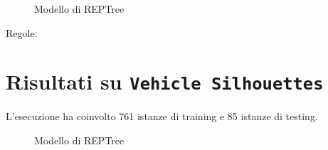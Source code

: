 \begin{mdframed}[frametitle=Esecuzione REPTree]
	\scriptsize
\end{mdframed}

%

\begin{figure}[htb]
	\caption{Modello di REPTree}
\end{figure}

\begin{mdframed}[frametitle=Esecuzione JRip]
	\scriptsize
\end{mdframed}

%

\noindent
\normalsize Regole:
\scriptsize

\pagebreak

\section{Risultati su \texttt{Vehicle Silhouettes}}

\normalsize L'esecuzione ha coinvolto 761 istanze di training e 85 istanze di testing.

\begin{mdframed}[frametitle=Esecuzione REPTree]
	\scriptsize
\end{mdframed}

%

\begin{figure}[htb]
	\caption{Modello di REPTree}
\end{figure}

